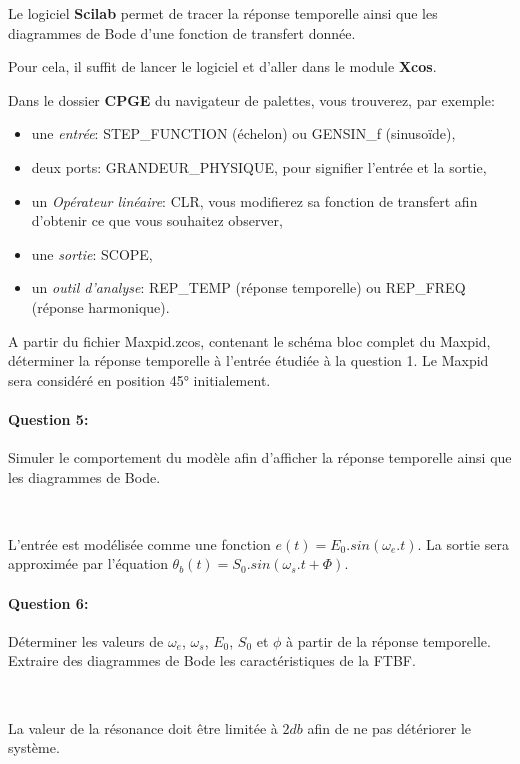 
Le logiciel \textbf{Scilab} permet de tracer la réponse temporelle ainsi que les diagrammes de Bode d'une fonction de transfert donnée.

Pour cela, il suffit de lancer le logiciel et d'aller dans le module \textbf{Xcos}.

Dans le dossier \textbf{CPGE} du navigateur de palettes, vous trouverez, par exemple:
\begin{itemize}
 \item une \textit{entrée}: STEP\_FUNCTION (échelon) ou GENSIN\_f (sinusoïde),
 \item deux ports: GRANDEUR\_PHYSIQUE, pour signifier l'entrée et la sortie, 
 \item un \textit{Opérateur linéaire}: CLR, vous modifierez sa fonction de transfert afin d'obtenir ce que vous souhaitez observer,
 \item une \textit{sortie}: SCOPE,
 \item un \textit{outil d'analyse}: REP\_TEMP (réponse temporelle) ou REP\_FREQ (réponse harmonique).
\end{itemize}

A partir du fichier Maxpid.zcos, contenant le schéma bloc complet du Maxpid, déterminer la réponse temporelle à l'entrée étudiée à la question 1. Le Maxpid sera considéré en position 45° initialement.

\paragraph{Question 5:} Simuler le comportement du modèle afin d'afficher la réponse temporelle ainsi que les diagrammes de Bode.

~\

L'entrée est modélisée comme une fonction $e(t)=E_0.sin(\omega_e.t)$. La sortie sera approximée par l'équation $\theta_b(t)=S_0.sin(\omega_s.t+\Phi)$.

\paragraph{Question 6:} Déterminer les valeurs de $\omega_e$, $\omega_s$, $E_0$, $S_0$ et $\phi$ à partir de la réponse temporelle. Extraire des diagrammes de Bode les caractéristiques de la FTBF.

~\

La valeur de la résonance doit être limitée à $2db$ afin de ne pas détériorer le système.

